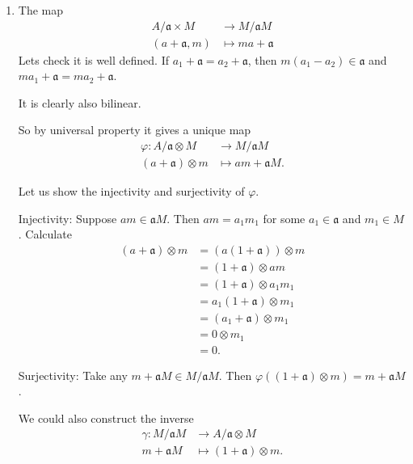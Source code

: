 \begin{exercise}{3}
\begin{enumerate}
        \item The map
            \begin{align*}
                A / \mathfrak{a} \times M &\rightarrow M / \mathfrak{a}M \\
                (a + \mathfrak{a}, m) &\mapsto m a + \mathfrak{a}
            \end{align*}
            Lets check it is well defined. If $a_1 + \mathfrak{a} = a_2 +
            \mathfrak{a}$, then $m (a_1 - a_2) \in \mathfrak{a}$ and $m a_1 +
            \mathfrak{a} = m a_2 + \mathfrak{a}$.

            It is clearly also bilinear.

            So by universal property it gives a unique map
            \begin{align*}
                \varphi \colon A / \mathfrak{a} \otimes M &\rightarrow M /
                \mathfrak{a}M \\
                (a + \mathfrak{a}) \otimes m &\mapsto a m + \mathfrak{a}M.
            \end{align*}

            Let us show the injectivity and surjectivity of $\varphi$.

            Injectivity: Suppose $a m \in \mathfrak{a}M$. Then $a m = a_1 m_1$
            for some $a_1 \in \mathfrak{a}$ and $m_1 \in M$. Calculate
            \begin{align*}
                (a + \mathfrak{a}) \otimes m &= (a(1 + \mathfrak{a})) \otimes m
                \\
                &= (1 + \mathfrak{a}) \otimes am \\
                &= (1 + \mathfrak{a}) \otimes a_1 m_1 \\
                &= a_1 (1 + \mathfrak{a}) \otimes m_1 \\
                &= (a_1 + \mathfrak{a}) \otimes m_1 \\
                &= 0 \otimes m_1 \\
                &= 0.
            \end{align*}

            Surjectivity:
            Take any $m + \mathfrak{a}M \in M/\mathfrak{a}M$. Then $\varphi((1 +
            \mathfrak{a}) \otimes m) = m + \mathfrak{a}M$.

            We could also construct the inverse
            \begin{align*}
                \gamma \colon M/\mathfrak{a}M &\rightarrow A/\mathfrak{a}
                \otimes M \\
                m + \mathfrak{a}M &\mapsto (1 + \mathfrak{a}) \otimes m.
            \end{align*}
    \end{enumerate}
\end{exercise}

\begin{exercise}{4}

\end{exercise}


